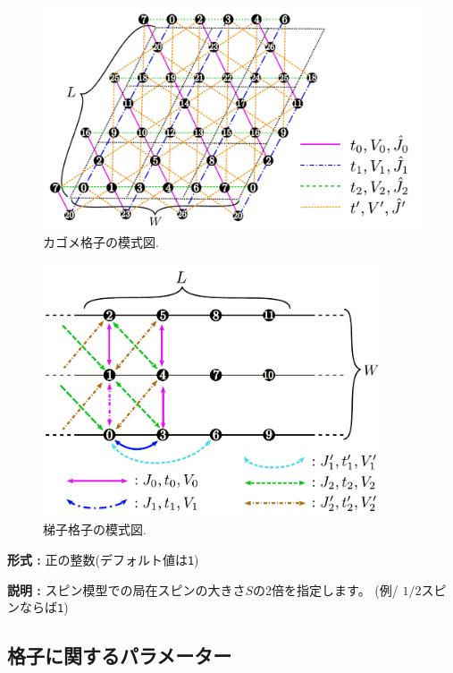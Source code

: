 \begin{itemize}
\begin{figure}[!htbp]
  \begin{center}
    \includegraphics[width=15cm]{../figs/kagome.pdf}
    \caption{カゴメ格子の模式図. 
    }
    \label{fig_kagome}
  \end{center}
\end{figure}

\begin{figure}[!htbp]
  \begin{center}
    \includegraphics[width=10cm]{../figs/ladder.pdf}
    \caption{梯子格子の模式図. 
    }
    \label{fig_ladder}
  \end{center}
\end{figure}

{\bf 形式 :} 正の整数(デフォルト値は\verb|1|)

{\bf 説明 :} スピン模型での局在スピンの大きさ$S$の2倍を指定します。
(例/ $1/2$スピンならば\verb|1|)

\end{itemize}

\subsection{格子に関するパラメーター}

